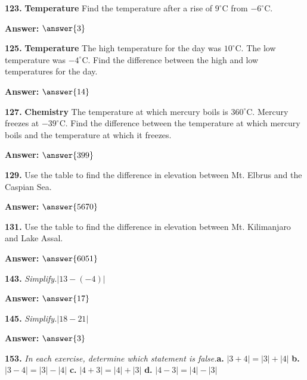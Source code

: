 \documentclass{ximera}
\begin{document}
\begin{problem}
\textbf{123.} \textbf{Temperature} Find the temperature after a rise of $9^\circ$C from
  $-6^\circ$C.

\textbf{Answer:} $\answer{3}$
\end{problem}

\begin{problem}
\textbf{125.} \textbf{Temperature} The high temperature for the day was $10^\circ$C. The low
  temperature was $-4^\circ$C. Find the difference between the high and low temperatures
  for the day.

\textbf{Answer:} $\answer{14}$
\end{problem}

\begin{problem}
\textbf{127.} \textbf{Chemistry} The temperature at which mercury boils is $360^\circ$C.
  Mercury freezes at $-39^\circ$C. Find the difference between the temperature at which
  mercury boils and the temperature at which it freezes.

\textbf{Answer:} $\answer{399}$
\end{problem}

\begin{problem}
\textbf{129.} Use the table to find the difference in elevation between Mt. Elbrus and the
  Caspian Sea.

\textbf{Answer:} $\answer{5670}$
\end{problem}

\begin{problem}
\textbf{131.} Use the table to find the difference in elevation between Mt. Kilimanjaro and
  Lake Assal.

\textbf{Answer:} $\answer{6051}$
\end{problem}

\begin{problem}
\textbf{143.} \emph{Simplify.}\quad $|13 - (-4)|$

\textbf{Answer:} $\answer{17}$
\end{problem}

\begin{problem}
\textbf{145.} \emph{Simplify.}\quad $|18 - 21|$

\textbf{Answer:} $\answer{3}$
\end{problem}

\begin{problem}
\textbf{153.} \emph{In each exercise, determine which statement is false.}\quad \textbf{a.} $|3 + 4| = |3| + |4|$ \qquad
  \textbf{b.} $|3 - 4| = |3| - |4|$ \qquad
  \textbf{c.} $|4 + 3| = |4| + |3|$ \qquad
  \textbf{d.} $|4 - 3| = |4| - |3|$

\begin{multipleChoice}
\end{multipleChoice}
\end{problem}
\end{document}
